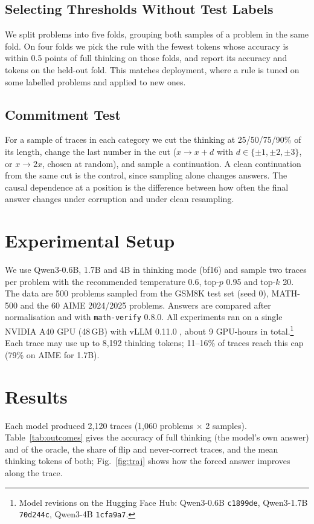 \documentclass[conference]{IEEEtran}
\begin{document}
\subsection{Selecting Thresholds Without Test Labels}
We split problems into five folds, grouping both samples of a problem in the same fold. On four folds we pick the rule
with the fewest tokens whose accuracy is within 0.5 points of full thinking on those folds, and report its accuracy and
tokens on the held-out fold. This matches deployment, where a rule is tuned on some labelled problems and applied to new
ones.

\subsection{Commitment Test}
For a sample of traces in each category we cut the thinking at 25/50/75/90\% of its length, change the last number in
the cut ($x\to x+d$ with $d\in\{\pm1,\pm2,\pm3\}$, or $x\to 2x$, chosen at random), and sample a continuation. A clean continuation from the same cut is the control,
since sampling alone changes answers. The causal dependence at a position is the difference between how often the
final answer changes under corruption and under clean resampling.

\section{Experimental Setup}
\label{sec:setup}
We use Qwen3-0.6B, 1.7B and 4B \cite{qwen3} in thinking mode (bf16) and sample two traces per problem with the
recommended temperature 0.6, top-$p$ 0.95 and top-$k$ 20. The data are 500 problems sampled from the GSM8K test
set \cite{gsm8k} (seed 0), MATH-500 \cite{math,lightman2024verify} and the 60 AIME 2024/2025 problems. Answers are
compared after normalisation and with \texttt{math-verify} 0.8.0. All experiments ran on a single NVIDIA A40 GPU (48\,GB) with vLLM 0.11.0
\cite{vllm}, about 9 GPU-hours in total.\footnote{Model revisions on the Hugging Face Hub: Qwen3-0.6B \texttt{c1899de},
Qwen3-1.7B \texttt{70d244c}, Qwen3-4B \texttt{1cfa9a7}.} Each trace may use up to 8{,}192 thinking tokens; 11--16\% of traces reach this cap (79\% on AIME for 1.7B).

\section{Results}
\label{sec:results}
Each model produced 2{,}120 traces (1{,}060 problems $\times$ 2 samples). Table~\ref{tab:outcomes} gives the
accuracy of full thinking (the model's own answer) and of the oracle, the share of flip and never-correct traces, and
the mean thinking tokens of both; Fig.~\ref{fig:traj} shows how the forced answer improves along the trace.
\end{document}

